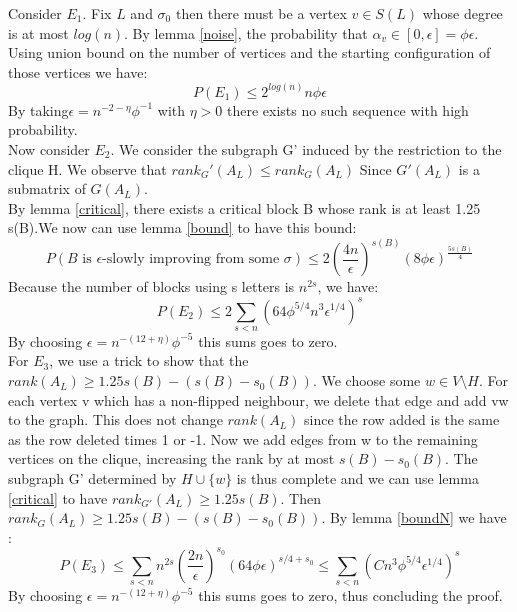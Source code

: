 Consider $E_1$. Fix $L$ and $\sigma_0$ then there must be a vertex $v \in S(L)$ whose degree is at most $log(n)$. By lemma  \ref{noise}, the probability that $\alpha_v \in [0, \epsilon] = \phi \epsilon$. Using union bound on the number of vertices and the starting configuration of those vertices we have:
\begin{equation}
P(E_1)  \leq 2^{log(n)}n \phi \epsilon
\end{equation}
By taking$\epsilon = n^{-2 - \eta} \phi^{-1}$ with $\eta > 0$ there exists no such sequence with high probability. \\

Now consider $E_2$. We consider the subgraph G' induced by the restriction to the clique H. We observe that $rank_G'(A_L) \leq rank_G(A_L)$ Since $G'(A_L)$ is a submatrix of $G(A_L)$.\\ 
By lemma \ref{critical}, there exists a critical block B whose rank is at least 1.25 s(B).We now can use lemma \ref{bound} to have this bound:
\begin{equation*}
P(B \text{ is }\epsilon \text {-slowly improving from some }\sigma) \leq 2(\frac{4n}{\epsilon})^{s(B)}(8\phi\epsilon)^{\frac{5s(B)}{4}}
\end{equation*}
Because the number of blocks using s letters is $n^{2s}$, we have:
\begin{equation*}
P(E_2) \leq 2 \sum_{s < n}(64\phi^{5/4}n^3\epsilon^{1/4})^s
\end{equation*}
By choosing $\epsilon = n^{-(12 + \eta)}\phi^{-5}$ this sums goes to zero.\\

For $E_3$, we use a trick to show that the $rank(A_L) \geq 1.25s(B) - (s(B) - s_0(B))$. We choose some $w \in V \setminus H$. For each vertex v which has a non-flipped neighbour, we delete that edge and add vw to the graph. This does not change $rank(A_L)$ since the row added is the same as the row deleted times 1 or -1. Now we add edges from w to the remaining vertices on the clique, increasing the rank by at most $s(B) - s_0(B)$. The subgraph G' determined by $H \cup \{w\}$ is thus complete and we can use  lemma \ref{critical} to have $rank_{G'}(A_L) \geq 1.25 s(B)$. Then $rank_G(A_L) \geq 1.25s(B) - (s(B) - s_0(B))$.
By lemma \ref{boundN} we have :
\begin{equation*}
P(E_3) \leq  \sum_{s < n}n^{2s}(\dfrac{2n}{\epsilon})^{s_0}(64\phi\epsilon)^{s/4 + s_0} \leq \sum_{s < n}(Cn^{3}\phi^{5/4}\epsilon^{1/4})^{s}
\end{equation*}
By choosing $\epsilon = n^{-(12 + \eta)}\phi^{-5}$ this sums goes to zero, thus concluding the proof.